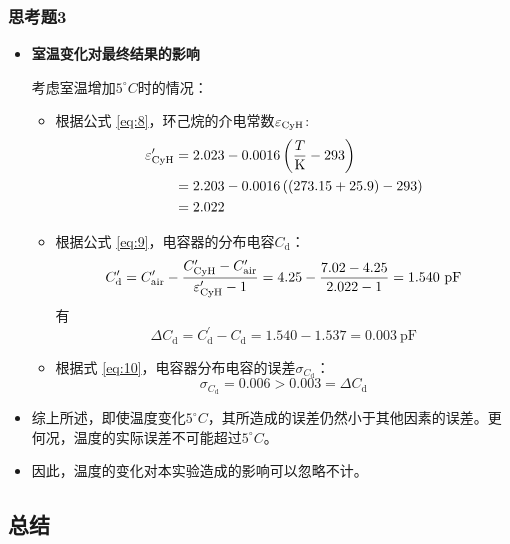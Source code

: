 \documentclass[cn,hazy,pku,12pt,normal,math=newtx,cite=super]{elegantnote}
\begin{document}
\subsubsection{思考题3}

\begin{itemize}
    \item \textbf{室温变化对最终结果的影响}

    考虑室温增加$5^\circ C$时的情况：
    \begin{itemize}
        \item 根据公式 \eqref{eq:8}，环己烷的介电常数$\varepsilon_{\ce{CyH}}$:
        \begin{align*}
            \varepsilon_{\ce{CyH}}^\prime &= 2.023 - 0.0016\left(\frac{T}{\mathrm{K}}-293\right)\\
            &= 2.203 - 0.0016\left((273.15+25.9)-293\right)\\
            &= 2.022
        \end{align*}
        \item 根据公式 \eqref{eq:9}，电容器的分布电容$C_{\text{d}}$：
        \begin{equation*}
            C_{\text{d}}^\prime = C_{\text{air}}^\prime - \frac{C_{\ce{CyH}}^\prime-C_{\text{air}}^\prime}{\varepsilon_{\ce{CyH}}^\prime-1} = 4.25 -\frac{7.02-4.25}{2.022-1} = 1.540\mathrm{~pF} 
        \end{equation*}
        有
        \begin{equation*}
            \Delta C_{\text{d}} = C_{\text{d}}^\prime - C_{\text{d}} = 1.540 - 1.537 = 0.003\mathrm{~pF} 
        \end{equation*}
        \item 根据式 \eqref{eq:10}，电容器分布电容的误差$\sigma_{C_{\text{d}}}$：
        \begin{equation*}
            \sigma_{C_{\text{d}}} = 0.006 > 0.003 = \Delta C_{\text{d}}
        \end{equation*}
    \end{itemize}

    \item 综上所述，即使温度变化$5^\circ C$，其所造成的误差仍然小于其他因素的误差。更何况，温度的实际误差不可能超过$5^\circ C$。
    \item 因此，温度的变化对本实验造成的影响可以忽略不计。
\end{itemize}

\subsection{总结}
\end{document}
